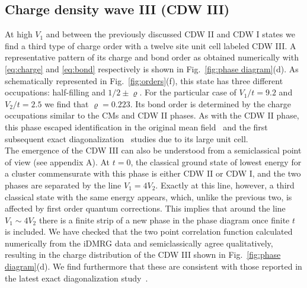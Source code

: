 \documentclass[aps,prx,10pt,twocolumn,floatfix,superscriptaddress,showpacs,numerical,footinbib]{revtex4-1}
\begin{document}
\subsection{Charge density wave III (CDW III)}
%
At high $V_{1}$ and between the previously discussed CDW II and CDW I states
we find a third type of charge order with a twelve site unit cell labeled CDW III.
%
A representative pattern of its charge and bond order as obtained numerically 
with \eqref{eq:charge} and \eqref{eq:bond} respectively
is shown in Fig.~\ref{fig:phase diagram}(d).
%
As schematically represented in Fig.~\ref{fig:orders}(f), this state has three 
different occupations: half-filling and $1/2\pm\varrho$.
%
For the particular case of $V_{1}/t=9.2$ and $V_{2}/t=2.5$ we find that $\varrho=0.223$.
%
Its bond order is determined by the charge occupations 
similar to the CMs and CDW II phases.
%
As with the CDW II phase, this phase escaped
identification in the original mean field~\cite{RQHZ08,WF10,GCC13} 
and the first subsequent exact diagonalization~\cite{GGNVC13,DH14,DCH14} studies 
due to its large unit cell.\\
%
The emergence of the CDW III can also be understood from a semiclassical point of view (see appendix A).
%
At $t=0$, the classical ground state of lowest energy for a cluster commensurate with this phase is either CDW II or CDW I, and the two phases are separated by the line $V_{1}=4V_{2}$. 
%
Exactly at this line, however, a third classical state with the same energy appears, which, unlike the previous two, is affected by first order quantum corrections. 
%
This implies that around the line $V_{1}\sim4V_{2}$ there is a finite strip of a new phase in the phase diagram once finite $t$ is included. 
%
We have checked that the two point correlation function calculated numerically from the iDMRG data and semiclassically 
agree qualitatively, resulting in the charge distribution of the CDW III shown in Fig.~\ref{fig:phase diagram}(d).
%
We find furthermore that these are consistent with those reported in the latest exact diagonalization study~\cite{CL15}. 
\end{document}

